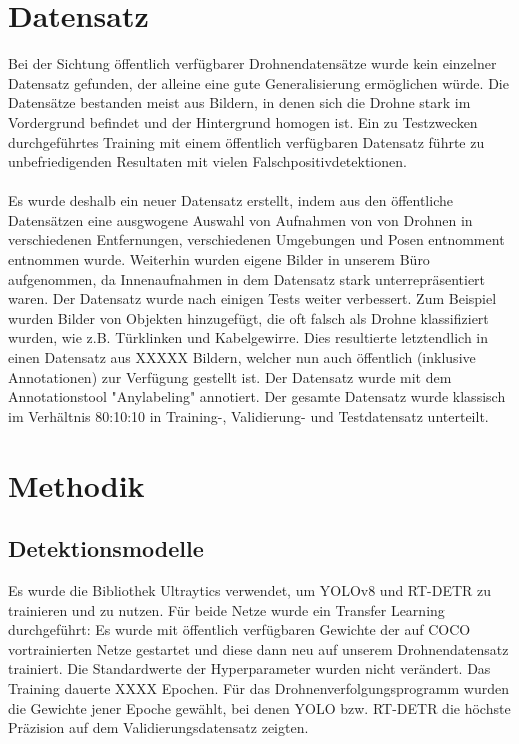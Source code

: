 \documentclass[runningheads]{llncs}
\begin{document}
\section{Datensatz}
Bei der Sichtung öffentlich verfügbarer Drohnendatensätze wurde kein einzelner Datensatz gefunden, der alleine eine gute Generalisierung ermöglichen würde. Die Datensätze bestanden meist aus Bildern, in denen sich die Drohne stark im Vordergrund befindet und der Hintergrund homogen ist. Ein zu Testzwecken durchgeführtes Training mit einem öffentlich verfügbaren Datensatz führte zu unbefriedigenden Resultaten mit vielen Falschpositivdetektionen.\\\\
Es wurde deshalb ein neuer Datensatz erstellt, indem aus den öffentliche Datensätzen eine ausgwogene Auswahl von Aufnahmen von von Drohnen in verschiedenen Entfernungen, verschiedenen Umgebungen und Posen entnomment entnommen wurde. Weiterhin wurden eigene Bilder in unserem Büro aufgenommen, da Innenaufnahmen in dem Datensatz stark unterrepräsentiert waren. Der Datensatz wurde nach einigen Tests weiter verbessert. Zum Beispiel wurden Bilder von Objekten hinzugefügt, die oft falsch als Drohne klassifiziert wurden, wie z.B. Türklinken und Kabelgewirre. Dies resultierte letztendlich in einen Datensatz aus XXXXX Bildern, welcher nun auch öffentlich (inklusive Annotationen) zur Verfügung gestellt ist. Der Datensatz wurde mit dem Annotationstool "Anylabeling" annotiert. Der gesamte Datensatz wurde klassisch im Verhältnis 80:10:10 in Training-, Validierung- und Testdatensatz unterteilt.

\section{Methodik}
\subsection{Detektionsmodelle}
Es wurde die Bibliothek Ultraytics verwendet, um YOLOv8 und RT-DETR zu trainieren und zu nutzen. Für beide Netze wurde ein Transfer Learning durchgeführt: Es wurde mit öffentlich verfügbaren Gewichte der auf COCO vortrainierten Netze gestartet und diese dann neu auf unserem Drohnendatensatz trainiert. Die Standardwerte der Hyperparameter wurden nicht verändert. Das Training dauerte XXXX Epochen. Für das Drohnenverfolgungsprogramm wurden die Gewichte jener Epoche gewählt, bei denen YOLO bzw. RT-DETR die höchste Präzision auf dem Validierungsdatensatz zeigten.\\\\
\end{document}
